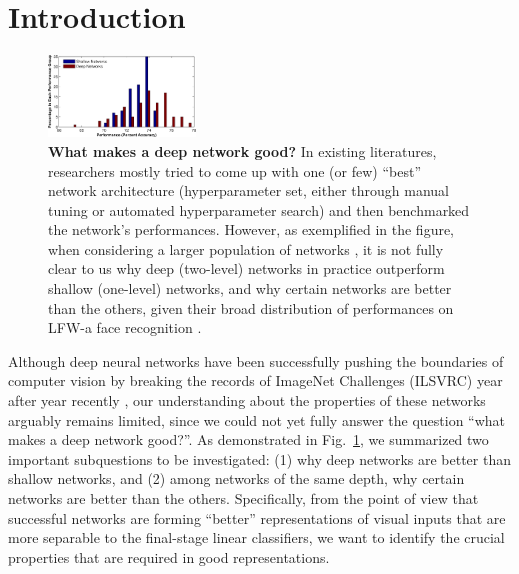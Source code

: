 \documentclass[10pt,twocolumn,letterpaper]{article}
\begin{document}
\section{Introduction}

\begin{figure}
\begin{center}
\includegraphics[width=0.35\textwidth]{Figs/e_fig7s_compact-crop.pdf} 
\end{center}
\caption{{\bf What makes a deep network good?}
In existing literatures, researchers mostly tried to come up with one (or few) ``best'' network architecture (\ie hyperparameter set, either through manual tuning or automated hyperparameter search) and then benchmarked the network's performances.
However, as exemplified in the figure, when considering a larger population of networks \cite{cox2011beyond}, it is not fully clear to us why deep (\ie two-level) networks in practice outperform shallow (\ie one-level) networks, and why certain networks are better than the others, given their broad distribution of performances on LFW-a face recognition \cite{LFWTech, wolf2011effective}.
} %
\label{fig:perf}
\end{figure}

Although deep neural networks have been successfully pushing the boundaries of computer vision by breaking the records of ImageNet Challenges (ILSVRC) year after year recently \cite{krizhevsky2012imagenet, sermanet2013overfeat, szegedy2014going}, our understanding about the properties of these networks arguably remains limited, since we could not yet fully answer the question ``what makes a deep network good?''.
As demonstrated in Fig.~\ref{fig:perf}, we summarized two important subquestions to be investigated: (1) why deep networks are better than shallow networks, and (2) among networks of the same depth, why certain networks are better than the others.
Specifically, from the point of view that successful networks are forming ``better'' representations of visual inputs that are more separable to the final-stage linear classifiers, we want to identify the crucial properties that are required in good representations.
\end{document}
